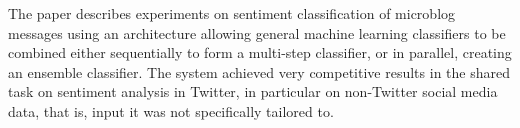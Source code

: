 The paper describes experiments on sentiment classification of microblog messages using an architecture allowing general machine learning classifiers to be combined either sequentially to form a multi-step classifier, or in parallel, creating an ensemble classifier. The system achieved very competitive results in the shared task on sentiment analysis in Twitter, in particular on non-Twitter social media data, that is, input it was not specifically tailored to.
